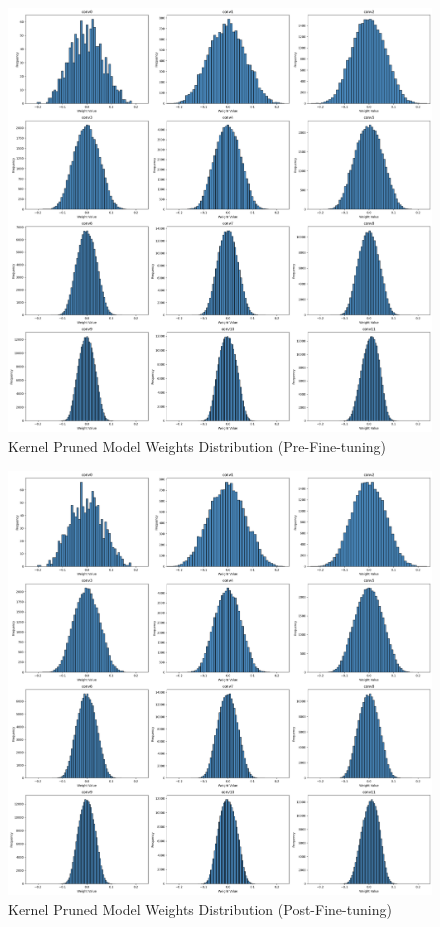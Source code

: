 \documentclass[12pt]{article}
\begin{document}
\begin{figure}[h]
  \centering
  \includegraphics[width=1\linewidth]{report_images/kernel_dist_pp.png}
  \caption{\label{fig:kernel_dist_pp}Kernel Pruned Model Weights Distribution (Pre-Fine-tuning)}
\end{figure}
\FloatBarrier

\begin{figure}[h]
  \centering
  \includegraphics[width=1\linewidth]{report_images/kernel_dist_ft.png}
  \caption{\label{fig:kernel_dist_ft}Kernel Pruned Model Weights Distribution (Post-Fine-tuning)}
\end{figure}
\FloatBarrier
\end{document}
